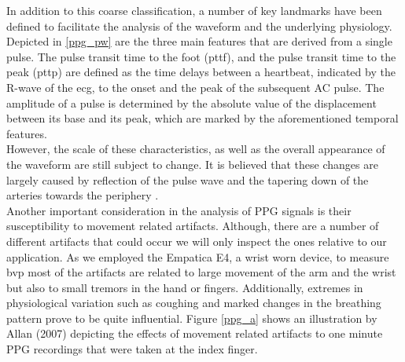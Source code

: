In addition to this coarse classification, a number of key landmarks have been defined to facilitate the analysis of the waveform and the underlying physiology. Depicted in \ref{ppg_pw} are the three main features that are derived from a single pulse. The pulse transit time to the foot (\gls{pttf}), and the pulse transit time to the peak (\gls{pttp}) are defined as the time delays between a heartbeat, indicated by the R-wave of the \gls{ecg}, to the onset and the peak of the subsequent AC pulse.
The amplitude of a pulse is determined by the absolute value of the displacement between its base and its peak, which are marked by the aforementioned temporal features.\\
However, the scale of these characteristics, as well as the overall appearance of the waveform are still subject to change. It is believed that these changes are largely caused by reflection of the pulse wave and the tapering down of the arteries towards the periphery \cite{Allan2007}.\\
Another important consideration in the analysis of PPG signals is their susceptibility to movement related artifacts. Although, there are a number of different artifacts that could occur we will only inspect the ones relative to our application. As we employed the Empatica E4, a wrist worn device, to measure \gls{bvp} most of the artifacts are related to large movement of the arm and the wrist but also to small tremors in the hand or fingers. Additionally, extremes in physiological variation such as coughing and marked changes in the breathing pattern prove to be quite influential. Figure \ref{ppg_a} shows an illustration by Allan (2007) depicting the effects of movement related artifacts to one minute PPG recordings that were taken at the index finger.

